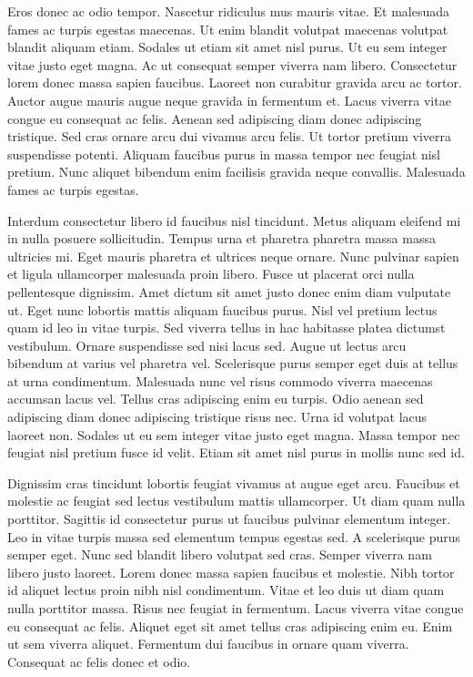 \documentclass[12pt]{article}
\begin{document}
\begin{multicols*}{2}
    Eros donec ac odio tempor. Nascetur ridiculus mus mauris vitae. Et malesuada fames ac turpis egestas maecenas. Ut enim blandit volutpat maecenas volutpat blandit aliquam etiam. Sodales ut etiam sit amet nisl purus. Ut eu sem integer vitae justo eget magna. Ac ut consequat semper viverra nam libero. Consectetur lorem donec massa sapien faucibus. Laoreet non curabitur gravida arcu ac tortor. Auctor augue mauris augue neque gravida in fermentum et. Lacus viverra vitae congue eu consequat ac felis. Aenean sed adipiscing diam donec adipiscing tristique. Sed cras ornare arcu dui vivamus arcu felis. Ut tortor pretium viverra suspendisse potenti. Aliquam faucibus purus in massa tempor nec feugiat nisl pretium. Nunc aliquet bibendum enim facilisis gravida neque convallis. Malesuada fames ac turpis egestas.

    Interdum consectetur libero id faucibus nisl tincidunt. Metus aliquam eleifend mi in nulla posuere sollicitudin. Tempus urna et pharetra pharetra massa massa ultricies mi. Eget mauris pharetra et ultrices neque ornare. Nunc pulvinar sapien et ligula ullamcorper malesuada proin libero. Fusce ut placerat orci nulla pellentesque dignissim. Amet dictum sit amet justo donec enim diam vulputate ut. Eget nunc lobortis mattis aliquam faucibus purus. Nisl vel pretium lectus quam id leo in vitae turpis. Sed viverra tellus in hac habitasse platea dictumst vestibulum. Ornare suspendisse sed nisi lacus sed. Augue ut lectus arcu bibendum at varius vel pharetra vel. Scelerisque purus semper eget duis at tellus at urna condimentum. Malesuada nunc vel risus commodo viverra maecenas accumsan lacus vel. Tellus cras adipiscing enim eu turpis. Odio aenean sed adipiscing diam donec adipiscing tristique risus nec. Urna id volutpat lacus laoreet non. Sodales ut eu sem integer vitae justo eget magna. Massa tempor nec feugiat nisl pretium fusce id velit. Etiam sit amet nisl purus in mollis nunc sed id.

    Dignissim cras tincidunt lobortis feugiat vivamus at augue eget arcu. Faucibus et molestie ac feugiat sed lectus vestibulum mattis ullamcorper. Ut diam quam nulla porttitor. Sagittis id consectetur purus ut faucibus pulvinar elementum integer. Leo in vitae turpis massa sed elementum tempus egestas sed. A scelerisque purus semper eget. Nunc sed blandit libero volutpat sed cras. Semper viverra nam libero justo laoreet. Lorem donec massa sapien faucibus et molestie. Nibh tortor id aliquet lectus proin nibh nisl condimentum. Vitae et leo duis ut diam quam nulla porttitor massa. Risus nec feugiat in fermentum. Lacus viverra vitae congue eu consequat ac felis. Aliquet eget sit amet tellus cras adipiscing enim eu. Enim ut sem viverra aliquet. Fermentum dui faucibus in ornare quam viverra. Consequat ac felis donec et odio.


\end{multicols*}
\end{document}
